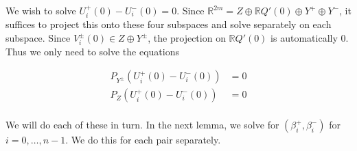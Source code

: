 \documentclass[12pt]{article}
\def\R{{\mathbb R}}
\begin{document}
We wish to solve $U_i^+(0) - U_i^-(0) = 0$. Since $\R^{2m} = Z \oplus \R Q'(0) \oplus Y^+ \oplus Y^-$, it suffices to project this onto these four subspaces and solve separately on each subspace. Since $V_i^\pm(0) \in Z \oplus Y^\pm$, the projection on $\R Q'(0)$ is automatically 0. Thus we only need to solve the equations

\begin{align*}
P_{Y^\pm}(U_i^+(0) - U_i^-(0)) &= 0 \\
P_Z(U_i^+(0) - U_i^-(0)) &= 0 \\
\end{align*}

We will do each of these in turn. In the next lemma, we solve for $(\beta_i^+, \beta_i^-)$ for $i = 0, \dots, n-1$. We do this for each pair separately.

\end{document}
